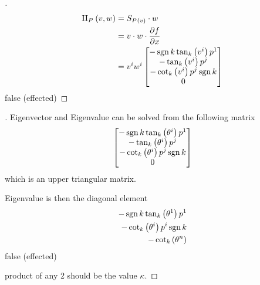 \documentclass[stu, babel, american, biblatex, a4paper, leqno, draftall]{apa7}
\begin{document}
\begin{proof}[]
    \skipped

    \begin{align*}
        \text{II}_{\tensor{P}{}}\left(v,w\right)
         & = S_{\tensor{P}{}\left(v\right)} \cdot w                  \\
         & = v \cdot w \cdot \frac{\partial f}{\partial x}           \\
         & = \tensor{v}{^i}\tensor{w}{^i} \begin{bmatrix}
            -\sign{k}\tan_k\left(\tensor{v}{^i}\right)\tensor{p}{^1} \\
            -\tan_k\left(\tensor{v}{^i}\right)\tensor{p}{^j}         \\
            -\cot_k\left(\tensor{v}{^i}\right)\tensor{p}{^j}\sign{k} \\
            0                                                        \\
        \end{bmatrix}
    \end{align*}
    false (effected)
\end{proof}
\begin{lemma}\label{Model:PrincipalCurvature}

\end{lemma}
\begin{proof}[]
    \skipped

    Eigenvector and Eigenvalue can be solved from the following matrix
    \begin{align*}
        \begin{bmatrix}
            -\sign{k}\tan_k\left(\tensor{\theta}{^i}\right)\tensor{p}{^1} \\
            -\tan_k\left(\tensor{\theta}{^i}\right)\tensor{p}{^j}         \\
            -\cot_k\left(\tensor{\theta}{^i}\right)\tensor{p}{^j}\sign{k} \\
            0                                                             \\
        \end{bmatrix}
    \end{align*}
    which is an upper triangular matrix.

    Eigenvalue is then the diagonal element
    \begin{align*}
        -\sign{k}\tan_k\left(\tensor{\theta}{^1}\right)\tensor{p}{^1} \\
        -\cot_k\left(\tensor{\theta}{^i}\right)\tensor{p}{^i}\sign{k} \\
        -\cot_k\left(\tensor{\theta}{^n}\right)
    \end{align*}
    false (effected)

    product of any 2 should be the value $\kappa$.
\end{proof}
\end{document}
